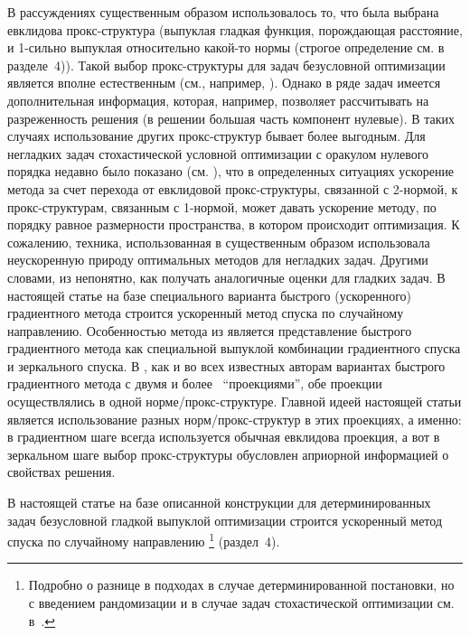 \documentclass[11pt]{article}
\begin{document}
	В рассуждениях \cite{nest} существенным образом использовалось то, что была выбрана евклидова прокс-структура (выпуклая гладкая функция, порождающая расстояние, и 1-сильно выпуклая относительно какой-то нормы (строгое определение см. в разделе~4)). Такой выбор прокс-структуры для задач безусловной оптимизации является вполне естественным (см., например, \cite{stochastic-gradients-inexact-oracle}). Однако в ряде задач имеется дополнительная информация, которая, например, позволяет рассчитывать на разреженность решения (в решении большая часть компонент нулевые). В таких случаях использование других прокс-структур бывает более выгодным. Для негладких задач стохастической условной оптимизации с оракулом нулевого порядка недавно было показано (см. \cite{GLUF, GKLUF}), что в определенных ситуациях ускорение метода за счет перехода от евклидовой прокс-структуры, связанной с 2-нормой, к прокс-структурам, связанным с 1-нормой, может давать ускорение методу, по порядку равное размерности пространства, в котором происходит оптимизация. К сожалению, техника, использованная в \cite{GLUF, GKLUF} существенным образом использовала неускоренную природу оптимальных методов для негладких задач. Другими словами, из \cite{GLUF, GKLUF} непонятно, как получать аналогичные оценки для гладких задач. В настоящей статье на базе специального варианта быстрого (ускоренного) градиентного метода \cite{Allen-Zhu-Orecchia-linear-coupling} строится ускоренный метод спуска по случайному направлению.
	Особенностью метода из \cite{Allen-Zhu-Orecchia-linear-coupling} является представление быстрого градиентного метода как специальной выпуклой комбинации градиентного спуска и зеркального спуска. В \cite{Allen-Zhu-Orecchia-linear-coupling}, как и во всех известных авторам вариантах быстрого градиентного метода с двумя и более $\,$ ``проекциями'', обе проекции осуществлялись в одной норме/прокс-структуре. Главной идеей настоящей статьи является использование разных норм/прокс-структур в этих проекциях, а именно: в градиентном шаге всегда используется обычная евклидова проекция, а вот в зеркальном шаге выбор прокс-структуры обусловлен априорной информацией о свойствах решения.
	
	В настоящей статье на базе описанной конструкции для детерминированных задач безусловной гладкой выпуклой оптимизации строится ускоренный метод спуска по случайному направлению \footnote{Подробно о разнице 
	в подходах в случае детерминированной постановки,
	но с введением рандомизации и в случае
	задач стохастической оптимизации
	см. в~\cite{Gasn_Universal_2018}.}  (раздел~4).
	
\end{document}
